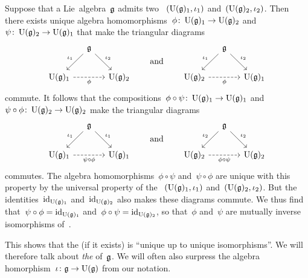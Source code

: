 \begin{remark}
  \label{uniqueness of universal enveloping algebras}
  Suppose that a Lie~algebra~$\mathfrak{g}$ admits two {\uas}~$(\operatorname{U}(\mathfrak{g})_1, \iota_1)$ and~$(\operatorname{U}(\mathfrak{g})_2, \iota_2)$.
  Then there exists unique algebra homomorphisms~$\phi \colon \operatorname{U}(\mathfrak{g})_1 \to \operatorname{U}(\mathfrak{g})_2$ and~$\psi \colon \operatorname{U}(\mathfrak{g})_2 \to \operatorname{U}(\mathfrak{g})_1$ that make the triangular diagrams
  \[
    \begin{tikzcd}[column sep = small]
      {}
      &
      \glie
      \arrow{dl}[above left]{\iota_1}
      \arrow{dr}[above right]{\iota_2}
      &
      {}
      \\
      \Univ(\glie)_1
      \arrow[dashed]{rr}[below]{\phi}
      &
      {}
      &
      \Univ(\glie)_2
    \end{tikzcd}
    \qquad\text{and}\qquad
    \begin{tikzcd}[column sep = small]
      {}
      &
      \glie
      \arrow{dl}[above left]{\iota_1}
      \arrow{dr}[above right]{\iota_2}
      &
      {}
      \\
      \Univ(\glie)_2
      \arrow[dashed]{rr}[below]{\phi}
      &
      {}
      &
      \Univ(\glie)_1
    \end{tikzcd}
  \]
  commute.
  It follows that the compositions~$\phi \circ \psi \colon \operatorname{U}(\mathfrak{g})_1 \to \operatorname{U}(\mathfrak{g})_1$ and~$\psi \circ \phi \colon \operatorname{U}(\mathfrak{g})_2 \to \operatorname{U}(\mathfrak{g})_2$ make the triangular diagrams
  \[
    \begin{tikzcd}[column sep = small]
      {}
      &
      \glie
      \arrow{dl}[above left]{\iota_1}
      \arrow{dr}[above right]{\iota_1}
      &
      {}
      \\
      \Univ(\glie)_1
      \arrow[dashed]{rr}[below]{\psi \circ \phi}
      &
      {}
      &
      \Univ(\glie)_1
    \end{tikzcd}
    \qquad\text{and}\qquad
    \begin{tikzcd}[column sep = small]
      {}
      &
      \glie
      \arrow{dl}[above left]{\iota_2}
      \arrow{dr}[above right]{\iota_2}
      &
      {}
      \\
      \Univ(\glie)_2
      \arrow[dashed]{rr}[below]{\phi \circ \psi}
      &
      {}
      &
      \Univ(\glie)_2
    \end{tikzcd}
  \]
  commutes.
  The algebra homomorphisms~$\phi \circ \psi$ and~$\psi \circ \phi$ are unique with this property by the universal property of the {\uas}~$(\operatorname{U}(\mathfrak{g})_1, \iota_1)$ and~$(\operatorname{U}(\mathfrak{g})_2, \iota_2)$.
  But the identities~$\operatorname{id}_{\operatorname{U}(\mathfrak{g})_1}$ and~$\operatorname{id}_{\operatorname{U}(\mathfrak{g})_2}$ also makes these diagrams commute.
  We thus find that~$\psi \circ \phi = \operatorname{id}_{\operatorname{U}(\mathfrak{g})_1}$ and~$\phi \circ \psi = \operatorname{id}_{\operatorname{U}(\mathfrak{g})_2}$, so that~$\phi$ and~$\psi$ are mutually inverse isomorphisms of~{\algebras{$\kf$}}.
  
  This shows that the {\ua} (if it exists) is \enquote{unique up to unique isomorphisms}.
  We will therefore talk about \emph{the} {\ua} of~$\mathfrak{g}$.
  We will often also surpress the algebra homorphism~$\iota \colon \mathfrak{g} \to \operatorname{U}(\mathfrak{g})$ from our notation.
\end{remark}


